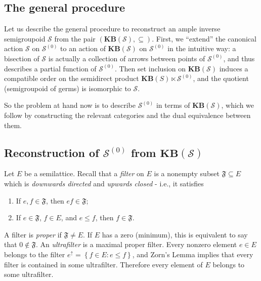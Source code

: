 \subsection{The general procedure}\label{subsec:generalprocedure}

Let us describe the general procedure to reconstruct an ample inverse semigroupoid $\mathcal{S}$ from the pair $(\mathbf{KB}(\mathcal{S}),\subseteq)$. First, we ``extend'' the canonical action $\mathcal{S}$ on $\mathcal{S}^{(0)}$ to an action of $\mathbf{KB}(\mathcal{S})$ on $\mathcal{S}^{(0)}$ in the intuitive way: a bisection of $\mathcal{S}$ is actually a collection of arrows between points of $\mathcal{S}^{(0)}$, and thus describes a partial function of $\mathcal{S}^{(0)}$. Then set inclusion on $\mathbf{KB}(\mathcal{S})$ induces a compatible order on the semidirect product $\mathbf{KB}(S)\ltimes\mathcal{S}^{(0)}$, and the quotient (semigroupoid of germs) is isomorphic to $\mathcal{S}$.

So the problem at hand now is to describe $\mathcal{S}^{(0)}$ in terms of $\mathbf{KB}(\mathcal{S})$, which we follow by constructing the relevant categories and the dual equivalence between them.

\subsection{Reconstruction of \texorpdfstring{$\mathcal{S}^{(0)}$}{S0} from \texorpdfstring{$\mathbf{KB}(\mathcal{S})$}{KB(S)}}\label{subsec:reconstructionofvertexspace}

Let $E$ be a semilattice. Recall that a \emph{filter} on $E$ is a nonempty subset $\mathfrak{F}\subseteq E$ which is \emph{downwards directed} and \emph{upwards closed} - i.e., it satisfies
\begin{enumerate}[label=(\roman*)]
    \item If $e,f\in\mathfrak{F}$, then $ef\in\mathfrak{F}$;
    \item If $e\in\mathfrak{F}$, $f\in E$, and $e\leq f$, then $f\in\mathfrak{F}$.
\end{enumerate}

A filter is \emph{proper} if $\mathfrak{F}\neq E$. If $E$ has a zero (minimum), this is equivalent to say that $0\not\in\mathfrak{F}$. An \emph{ultrafilter} is a maximal proper filter. Every nonzero element $e\in E$ belongs to the filter $e^\uparrow=\left\{f\in E:e\leq f\right\}$, and Zorn's Lemma implies that every filter is contained in some ultrafilter. Therefore every element of $E$ belongs to some ultrafilter.

